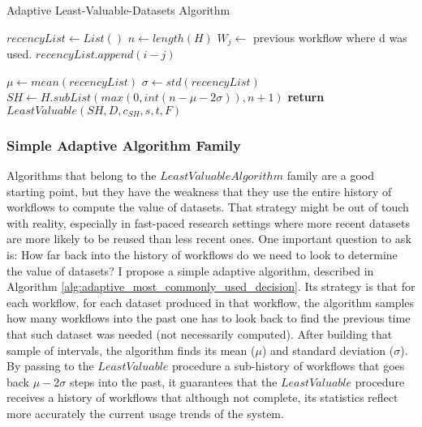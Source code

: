 \begin{algorithm}
\begin{singlespace}
\caption{Adaptive Least-Valuable-Datasets Algorithm}
\label{alg:adaptive_most_commonly_used_decision}
\begin{algorithmic}[1]
	\State $recencyList \gets List()$
	\State $n \gets length(H)$
			\State $W_j \gets$ previous workflow where d was used.
				\State $recencyList.append(i - j)$
			\EndIf
		\EndFor
			
	\EndFor
	\State $\mu \gets mean(recencyList)$
	\State $\sigma \gets std(recencyList)$
	\State $SH \gets H.subList(max(0, int(n - \mu - 2\sigma)), n + 1)$
	\State \textbf{return} $LeastValuable(SH, D, c_{SH}, s, t, F)$

\EndProcedure
\end{algorithmic}
\end{singlespace}
\end{algorithm}

\subsubsection{Simple Adaptive Algorithm Family}
Algorithms that belong to the $Least Valuable Algorithm$ family are a good starting point, but they have the weakness that they use the entire history of workflows to compute the value of datasets. That strategy might be out of touch with reality, especially in fast-paced research settings where more recent datasets are more likely to be reused than less recent ones. One important question to ask is: How far back into the history of workflows do we need to look to determine the value of datasets? I propose a simple adaptive algorithm, described in Algorithm \ref{alg:adaptive_most_commonly_used_decision}.  Its strategy is that for each workflow, for each dataset produced in that workflow, the algorithm samples how many workflows into the past one has to look back to find the previous time that such dataset was needed (not necessarily computed).  After building that sample of intervals, the algorithm finds its mean ($\mu$) and standard deviation ($\sigma$).  By passing to the $LeastValuable$ procedure a sub-history of workflows that goes back $\mu - 2\sigma$ steps into the past, it guarantees that the $LeastValuable$ procedure receives a history of workflows that although not complete, its statistics reflect more accurately the current usage trends of the system.
